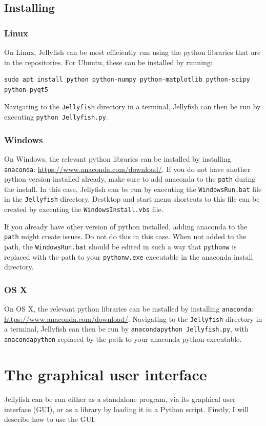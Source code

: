 \documentclass[11pt,a4paper]{article}
\begin{document}
\subsection{Installing}
\subsubsection{Linux}
On Linux, Jellyfish can be most efficiently run using the python libraries that are in the
repositories. For Ubuntu, these can be installed by running:
\begin{verbatim}
sudo apt install python python-numpy python-matplotlib python-scipy
python-pyqt5
\end{verbatim}
Navigating to the \texttt{Jellyfish} directory in a terminal, Jellyfish can then be run
by executing \texttt{python Jellyfish.py}.

\subsubsection{Windows}
On Windows, the relevant python libraries can be installed by installing \texttt{anaconda}:
\url{https://www.anaconda.com/download/}. If you do not have another python version installed
already, make sure to add anaconda to the \texttt{path} during the install. In this case, Jellyfish
can be run by executing the \texttt{WindowsRun.bat} file in the \texttt{Jellyfish} directory.
Destktop and start menu shortcuts to this file can be created by executing the
\texttt{WindowsInstall.vbs} file.

If you already have other version of python installed, adding anaconda to the \texttt{path} might
create issues. Do not do this in this case. When not added to the path, the \texttt{WindowsRun.bat}
should be edited in such a way that \texttt{pythonw} is replaced with the path to your
\texttt{pythonw.exe} executable in the anaconda install directory. 

\subsubsection{OS X}
On OS X, the relevant python libraries can be installed by installing \texttt{anaconda}:
\url{https://www.anaconda.com/download/}. Navigating to the \texttt{Jellyfish} directory in a
terminal, Jellyfish can then be run by \texttt{anacondapython Jellyfish.py}, with \texttt{anacondapython}
replaced by the path to your anaconda python executable.

\section{The graphical user interface}
Jellyfish can be run either as a standalone program, via its graphical user interface (GUI), or as a
library by loading it in a Python script. Firstly, I will describe how to use the GUI.
\end{document}
